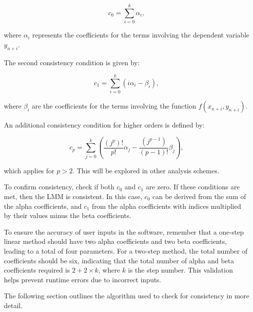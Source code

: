 \documentclass[a4paper, twoside]{report} %
\begin{document}
	\begin{equation}
		c_0 = \sum_{i=0}^{k} \alpha_{i},
	\end{equation}

	where \(\alpha_{i}\) represents the coefficients for the terms involving the dependent variable \(y_{n+i}\).

	The second consistency condition is given by:

	\begin{equation}
		c_1 = \sum_{i=0}^{k} (i \alpha_{i} - \beta_{i}),
	\end{equation}

	where \(\beta_{i}\) are the coefficients for the terms involving the function \(f(x_{n+i}, y_{n+i})\).

	An additional consistency condition for higher orders is defined by:

	\begin{equation}
		c_p = \sum_{j=0}^{k} \left( \frac{(j^p)!}{p!} \alpha_j - \frac{(j^{p-1})}{(p-1)!} \beta_j \right),
	\end{equation}

	which applies for \(p > 2\). This will be explored in other analysis schemes.

	To confirm consistency, check if both \(c_0\) and \(c_1\) are zero. If these conditions are met, then the LMM is consistent. In this case, \(c_0\) can be derived from the sum of the alpha coefficients, and \(c_1\) from the alpha coefficients with indices multiplied by their values minus the beta coefficients.

	To ensure the accuracy of user inputs in the software, remember that a one-step linear method should have two alpha coefficients and two beta coefficients, leading to a total of four parameters. For a two-step method, the total number of coefficients should be six, indicating that the total number of alpha and beta coefficients required is \(2 + 2 \times k\), where \(k\) is the step number. This validation helps prevent runtime errors due to incorrect inputs.

	The following section outlines the algorithm used to check for consistency in more detail.
\end{document}
